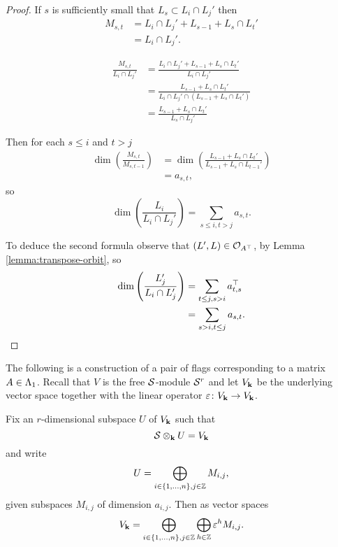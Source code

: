\documentclass[a4paper, 11pt]{report}
\begin{document}
\begin{proof}
If $s$ is sufficiently small that $L_s\subset L_i\cap L_j'$ then
\begin{align*}
M_{s,t}
&= L_i\cap L_j' + L_{s-1} + L_s\cap L_t'\\
&= L_i\cap L_j'.
\end{align*}

\begin{align*}
\frac{M_{s,t}}{L_i\cap L_j'}
&= \frac{L_i\cap L_j' + L_{s-1} + L_s\cap L_t'}{L_i\cap L_j'}\\
&= \frac{L_{s-1} + L_s\cap L_t'}{L_i\cap L_j'\cap(L_{s-1} + L_s\cap L_t')}\\
&= \frac{L_{s-1} + L_s\cap L_t'}{L_s\cap L_j'}
\end{align*}

Then for each $s\le i$ and $t>j$
\begin{align*}
\dim\left(\frac{M_{s,t}}{M_{s,t-1}}\right)
&= \dim\left(\frac{L_{s-1} + L_s\cap L_t'}{L_{s-1} + L_s\cap L_{t-1}'}\right)\\
&= a_{s,t},
\end{align*}
so
\begin{equation*}
\dim\left(\frac{L_i}{L_i\cap L_j'}\right) = \sum_{s\le i, t>j} a_{s,t}.
\end{equation*}

To deduce the second formula observe that $(L',L)\in\mathcal{O}_{A^\top}$, by Lemma \ref{lemma:transpose-orbit}, so
\begin{align*}
\dim\left(\frac{L_j'}{L_i\cap L_j'}\right)
&= \sum_{t\le j, s>i} a_{t,s}^\top\\
&= \sum_{s>i, t\le j} a_{s,t}.
\end{align*}
\end{proof}

The following is a construction of a pair of flags corresponding to a matrix $A\in\Lambda_1{}$. Recall that $V$ is the free $\mathcal{S}$-module $\mathcal{S}^r$ and let $V_{\mathbf{k}}$ be the underlying vector space together with the linear operator $\varepsilon\colon V_{\mathbf{k}}\to V_{\mathbf{k}}$.

Fix an $r$-dimensional subspace $U$ of $V_{\mathbf{k}}$ such that
\begin{equation*}
\mathcal{S}\otimes_{\mathbf{k}}U = V_{\mathbf{k}}
\end{equation*}
and write
\begin{equation*}
U = \bigoplus_{i\in\{1,\ldots,n\},j\in\mathbb{Z}} M_{i,j},
\end{equation*}
given subspaces $M_{i,j}$ of dimension $a_{i,j}$. Then as vector spaces
\begin{equation*}
V_{\mathbf{k}} = \bigoplus_{i\in\{1,\ldots,n\},j\in\mathbb{Z}}\bigoplus_{h\in\mathbb{Z}} \varepsilon^hM_{i,j}.
\end{equation*}
\end{document}
